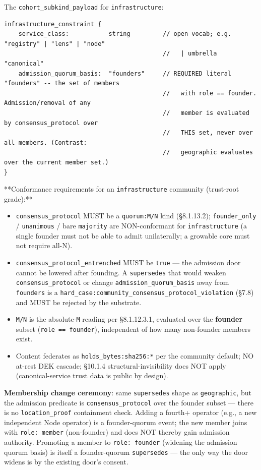 \documentclass[10pt]{article}
\begin{document}
The \texttt{cohort\_subkind\_payload} for \texttt{infrastructure}:


\begin{lstlisting}
infrastructure_constraint {
    service_class:           string         // open vocab; e.g. "registry" | "lens" | "node"
                                            //   | umbrella "canonical"
    admission_quorum_basis:  "founders"     // REQUIRED literal "founders" -- the set of members
                                            //   with role == founder. Admission/removal of any
                                            //   member is evaluated by consensus_protocol over
                                            //   THIS set, never over all members. (Contrast:
                                            //   geographic evaluates over the current member set.)
}
\end{lstlisting}

**Conformance requirements for an \texttt{infrastructure} community (trust-root grade):**


\begin{itemize}\setlength\itemsep{0pt}
\item \texttt{consensus\_protocol} MUST be a \texttt{quorum:M/N} kind (§8.1.13.2); \texttt{founder\_only} / \texttt{unanimous} / bare \texttt{majority} are NON-conformant for \texttt{infrastructure} (a single founder must not be able to admit unilaterally; a growable core must not require all-N).
\item \texttt{consensus\_protocol\_entrenched} MUST be \texttt{true} — the admission door cannot be lowered after founding. A \texttt{supersedes} that would weaken \texttt{consensus\_protocol} or change \texttt{admission\_quorum\_basis} away from \texttt{founders} is a \texttt{hard\_case:community\_consensus\_protocol\_violation} (§7.8) and MUST be rejected by the substrate.
\item \texttt{M/N} is the absolute-\texttt{M} reading per §8.1.12.3.1, evaluated over the \textbf{founder} subset (\texttt{role == founder}), independent of how many non-founder members exist.
\item Content federates as \texttt{holds\_bytes:sha256:*} per the community default; NO at-rest DEK cascade; §10.1.4 structural-invisibility does NOT apply (canonical-service trust data is public by design).
\end{itemize}


\textbf{Membership change ceremony}: same \texttt{supersedes} shape as \texttt{geographic}, but the admission predicate is \texttt{consensus\_protocol} over the founder subset — there is no \texttt{location\_proof} containment check. Adding a fourth+ operator (e.g., a new independent Node operator) is a founder-quorum event; the new member joins with \texttt{role: member} (non-founder) and does NOT thereby gain admission authority. Promoting a member to \texttt{role: founder} (widening the admission quorum basis) is itself a founder-quorum \texttt{supersedes} — the only way the door widens is by the existing door's consent.
\end{document}
